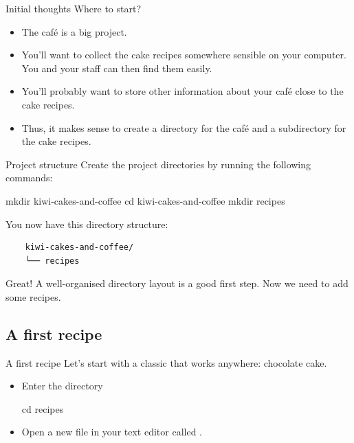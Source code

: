 \begin{frame}{Initial thoughts}
Where to start?
    \begin{itemize}
        \item The café is a big project.
        \item You'll want to collect the cake recipes
            somewhere sensible on your computer.  You and your staff
            can then find them easily.
        \item You'll probably want to store other information about your
            café close to the cake recipes.
        \item Thus, it makes sense to create a directory for the café and a
            subdirectory for the cake recipes.
    \end{itemize}
\end{frame}

\begin{frame}[fragile]{Project structure}
Create the project directories by running the following commands:
\begin{shellcode}
    mkdir kiwi-cakes-and-coffee
    cd kiwi-cakes-and-coffee
    mkdir recipes
\end{shellcode}

You now have this directory structure:
\begin{verbatim}
    kiwi-cakes-and-coffee/
    └── recipes
\end{verbatim}

    Great!  A well-organised directory layout is a good first step.  Now we
    need to add some recipes.
\end{frame}

\subsection{A first recipe}

\begin{frame}[fragile]{A first recipe}
    Let's start with a classic that works anywhere: chocolate cake.

    \begin{itemize}
        \item Enter the  directory
        \begin{shellcode}
            cd recipes
        \end{shellcode}
        \item Open a new file in your text editor called .
    \end{itemize}
\end{frame}

